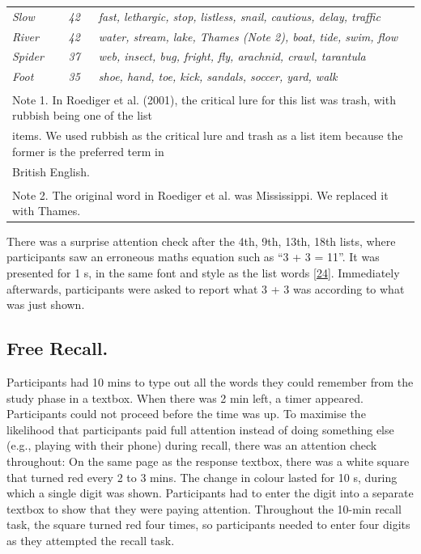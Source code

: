 \documentclass[
]{article}
\begin{document}
\begin{table}[H]
\begin{tabular}[t]{lll}
\em{Slow} & \em{42} & \em{fast, lethargic, stop, listless, snail, cautious, delay, traffic}\\
\em{River} & \em{42} & \em{water, stream, lake, Thames (Note 2), boat, tide, swim, flow}\\
\addlinespace
\em{Spider} & \em{37} & \em{web, insect, bug, fright, fly, arachnid, crawl, tarantula}\\
\em{Foot} & \em{35} & \em{shoe, hand, toe, kick, sandals, soccer, yard, walk}\\
\bottomrule
\multicolumn{3}{l}{\textsuperscript{} Note 1. In Roediger et al. (2001), the critical lure for this list was trash, with rubbish being one of the list}\\
\multicolumn{3}{l}{items. We used rubbish as the critical lure and trash as a list item because the former is the preferred term in}\\
\multicolumn{3}{l}{British English.}\\
\multicolumn{3}{l}{\textsuperscript{} Note 2. The original word in Roediger et al. was Mississippi. We replaced it with Thames.}\\
\end{tabular}
\end{table}

There was a surprise attention check after the 4th, 9th, 13th, 18th lists, where participants saw an erroneous maths equation such as ``3 + 3 = 11''. It was presented for 1 s, in the same font and style as the list words {[}\protect\hyperlink{ref-thomas2017a}{24}{]}. Immediately afterwards, participants were asked to report what 3 + 3 was according to what was just shown.

\hypertarget{free-recall.}{%
\subsection{Free Recall.}\label{free-recall.}}

Participants had 10 mins to type out all the words they could remember from the study phase in a textbox. When there was 2 min left, a timer appeared. Participants could not proceed before the time was up.
To maximise the likelihood that participants paid full attention instead of doing something else (e.g., playing with their phone) during recall, there was an attention check throughout: On the same page as the response textbox, there was a white square that turned red every 2 to 3 mins. The change in colour lasted for 10 s, during which a single digit was shown. Participants had to enter the digit into a separate textbox to show that they were paying attention. Throughout the 10-min recall task, the square turned red four times, so participants needed to enter four digits as they attempted the recall task.
\end{document}
